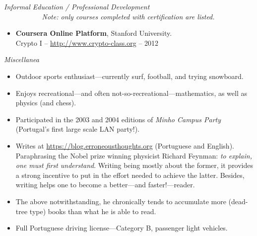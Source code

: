 \documentclass[a4paper,9pt]{extarticle}
\newenvironment{topic}[1]
   {{\noindent\large\bfseries\raisebox{0pt}[\height][1ex]{#1}\hrule}%
    \begin{list}{}{%
       \setlength{\leftmargin}{.0cm}}%
    \item[]}
   {\end{list}\medskip}
\begin{document}
\newpage   %
\begin{topic}{Additional Information}
  {\itshape Informal Education / Professional Development}\\ 
  {\slshape \small \mbox{\ \ \ \ \ \ \ \ \ \ } Note: only courses completed with certification are listed.}
  \begin{itemize}[leftmargin=*]
    \item {\bfseries Coursera Online Platform}, Stanford University.\\
      Crypto I -- \url{http://www.crypto-class.org} -- 2012
  \end{itemize}
  {\itshape Miscellanea}  
  \begin{itemize}[leftmargin=*]
    \item{Outdoor sports enthusiast---currently surf, football, and trying
      snowboard.}
    \item{Enjoys recreational---and often not-so-recreational---mathematics,
      as well as physics (and chess).}
    \item{Participated in the 2003 and 2004 editions of \emph{Minho Campus
      Party} (Portugal's first large scale LAN party!).}
    \item Writes at \url{https://blog.erroneousthoughts.org} (Portuguese and 
      English). Paraphrasing the Nobel prize winning physicist Richard Feynman: 
      \emph{to explain, one must first understand}. Writing being mostly about 
      the former, it provides a strong incentive to put in the effort needed to 
      achieve the latter. Besides, writing helps one to become a better---and 
      faster!---reader.
    \item The above notwithstanding, he chronically tends to accumulate more (dead-tree type) books than 
      what he is able to read.
    \item{Full Portuguese driving license---Category B, passenger light
      vehicles.}
  \end{itemize}
\end{topic}
\end{document}
